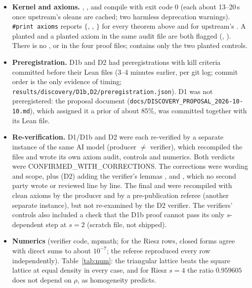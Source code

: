 \documentclass[11pt]{article}
\begin{document}
\begin{itemize}
\item \textbf{Kernel and axioms.} , ,  and  compile with
exit code 0 (each about 13--20\,s once upstream's oleans are cached; two harmless deprecation warnings). \texttt{\#print axioms} reports $\{$, ,
$\}$ for every theorem above and for upstream's . A planted  and a planted axiom
in the same audit file are both flagged (, ). There is no ,  or  in the four proof files;  contains only the two planted
controls.
\item \textbf{Preregistration.} D1b and D2 had preregistrations with kill criteria committed before their Lean files (3--4 minutes earlier,
per git log; commit order is the only evidence of timing; \texttt{results/discovery/D1b,D2/preregistration.json}). D1 was not preregistered:
the proposal document (\texttt{docs/DISCOVERY\_PROPOSAL\_2026-10-10.md}), which assigned it a prior of about 85\%, was committed together
with its Lean file.
\item \textbf{Re-verification.} D1/D1b and D2 were each re-verified by a separate instance of the same AI model (producer $\neq$ verifier),
which recompiled the files and wrote its own axiom audit, controls and numerics. Both verdicts were CONFIRMED\_WITH\_CORRECTIONS. The
corrections were wording and scope, plus (D2) adding the verifier's lemmas ,  and ,
which no second party wrote or reviewed line by line. The final  and  were recompiled with clean
axioms by the producer and by a pre-publication referee (another separate instance), but not re-examined by the D2 verifier. The verifiers' controls also included a check that the D1b proof cannot pass its only $s$-dependent step at $s=2$
(scratch file, not shipped).
\item \textbf{Numerics} (verifier code, mpmath; for the Riesz rows, closed forms agree with direct sums to about $10^{-7}$; the referee
reproduced every row independently). Table~\ref{tab:num}: the triangular
lattice beats the square lattice at equal density in every case, and for Riesz $s=4$ the ratio $0.959605$ does not depend on $\rho$, as
homogeneity predicts.
\end{itemize}
\end{document}
